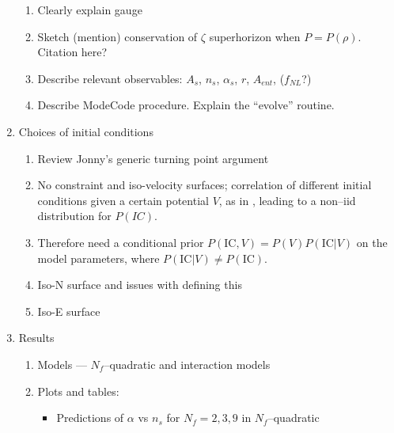 \documentclass[a4paper,11pt]{article}
\begin{document}
\begin{enumerate}
\begin{enumerate}
      \item Clearly explain gauge

      \item Sketch (mention) conservation of $\zeta$ superhorizon when $P=P(\rho)$.  Citation here?

      \item Describe relevant observables: $A_s$, $n_s$, $\alpha_s$, $r$, $A_{ent}$, ($f_{NL}$?)

      \item Describe ModeCode procedure.  Explain the ``evolve'' routine.

    \end{enumerate}

  \item Choices of initial conditions

    \begin{enumerate}

      \item Review Jonny's generic turning point argument

      \item No constraint and iso-velocity surfaces; correlation of different initial conditions given a certain potential $V$, as in \cite{Easther:2013bga}, leading to a non--iid distribution for $P(IC)$.

      \item Therefore need a conditional prior $P(\mathrm{IC},V) = P(V) P(\mathrm{IC}|V)$ on the model parameters, where $P(\mathrm{IC}|V) \ne P(\mathrm{IC})$.

      \item Iso-N surface \cite{Frazer:2013zoa} and issues with defining this

      \item Iso-E surface \cite{Easther:2013bga}


    \end{enumerate}

  \item Results

    \begin{enumerate}

      \item Models --- $N_f$--quadratic and interaction models

      \item Plots and tables:

        \begin{itemize}

          \item Predictions of $\alpha$ vs $n_s$ for $N_f=2,3,9$ in $N_f$--quadratic


\end{itemize}
\end{enumerate}
\end{enumerate}
\end{document}
